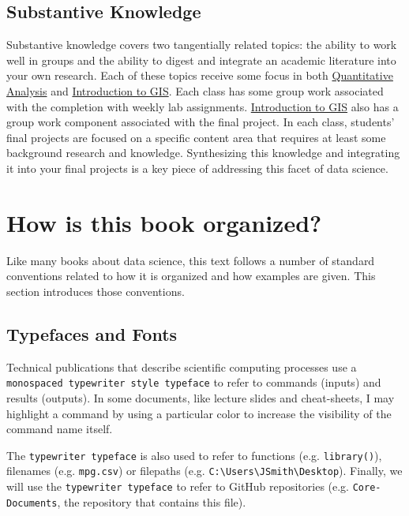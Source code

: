 \documentclass[]{book}
\theoremstyle{definition}
\theoremstyle{definition}
\theoremstyle{definition}
\theoremstyle{remark}
\begin{document}
\subsection{Substantive Knowledge}\label{substantive-knowledge}

Substantive knowledge covers two tangentially related topics: the
ability to work well in groups and the ability to digest and integrate
an academic literature into your own research. Each of these topics
receive some focus in both
\href{https://slu-soc5050.github.io}{Quantitative Analysis} and
\href{https://slu-soc5650.github.io}{Introduction to GIS}. Each class
has some group work associated with the completion with weekly lab
assignments. \href{https://slu-soc5650.github.io}{Introduction to GIS}
also has a group work component associated with the final project. In
each class, students' final projects are focused on a specific content
area that requires at least some background research and knowledge.
Synthesizing this knowledge and integrating it into your final projects
is a key piece of addressing this facet of data science.

\section{How is this book organized?}\label{how-is-this-book-organized}

Like many books about data science, this text follows a number of
standard conventions related to how it is organized and how examples are
given. This section introduces those conventions.

\subsection{Typefaces and Fonts}\label{typefaces-and-fonts}

Technical publications that describe scientific computing processes use
a \texttt{monospaced\ typewriter\ style\ typeface} to refer to commands
(inputs) and results (outputs). In some documents, like lecture slides
and cheat-sheets, I may highlight a command by using a particular color
to increase the visibility of the command name itself.

The \texttt{typewriter\ typeface} is also used to refer to functions
(e.g. \texttt{library()}), filenames (e.g. \texttt{mpg.csv}) or
filepaths (e.g.
\texttt{C:\textbackslash{}Users\textbackslash{}JSmith\textbackslash{}Desktop}).
Finally, we will use the \texttt{typewriter\ typeface} to refer to
GitHub repositories (e.g. \texttt{Core-Documents}, the repository that
contains this file).
\end{document}
